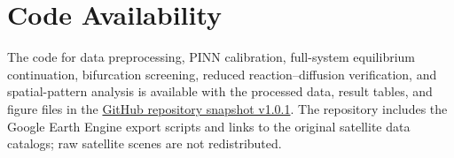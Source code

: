 \documentclass[12pt,a4paper]{article}
\begin{document}
\section*{Code Availability}


The code for data preprocessing, PINN calibration, full-system equilibrium
continuation, bifurcation screening, reduced reaction--diffusion verification,
and spatial-pattern analysis is available with the processed data, result
tables, and figure files in the \href{https://github.com/PangYingxin-max/lower-tarim-pinn/tree/v1.0.1}{GitHub repository snapshot v1.0.1}.
The repository includes the Google Earth Engine export scripts and links to the
original satellite data catalogs; raw satellite scenes are not redistributed.



\end{document}
